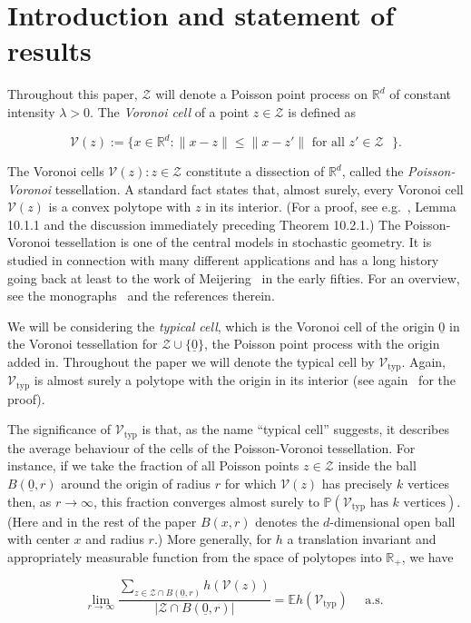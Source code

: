 \documentclass[11pt]{article}%
\newcommand{\Vcal}[0]{\ensuremath{{\mathcal V}}}
\newcommand{\Zcal}[0]{\ensuremath{{\mathcal Z}}}
\newcommand{\eR}[0]{\ensuremath{ \mathbb R}}
\newcommand{\norm}[1]{\ensuremath{\|#1\|}}
\newcommand{\Pee}[0]{\ensuremath{{\mathbb P}}}
\newcommand{\Ee}[0]{\ensuremath{{\mathbb E}}}
\newcommand{\orig}{\underline{0}}
\newcommand{\Vtyp}[0]{\Vcal_{\text{typ}}}
\begin{document}
\section{Introduction and statement of results}



Throughout this paper, $\Zcal$ will denote a Poisson point process on $\eR^d$ of constant intensity $\lambda>0$.
The {\em Voronoi cell} of a point $z \in \Zcal$ is defined as 

$$ \Vcal(z) := \{ x \in \eR^d : \norm{x-z} \leq \norm{x-z'} \text{ for all $z'\in \Zcal$ }\}. $$

The Voronoi cells $\Vcal(z) : z \in \Zcal$ constitute a dissection of $\eR^d$, called the {\em Poisson-Voronoi} 
tessellation. A standard fact states that, almost surely, every Voronoi cell $\Vcal(z)$ is a convex polytope
with $z$ in its interior. (For a proof, see e.g.~\cite{SchneiderWeil}, Lemma 10.1.1 and the discussion 
immediately preceding Theorem 10.2.1.)
The Poisson-Voronoi tessellation is one of the central models
in stochastic geometry. It is studied in connection with many different applications and has 
a long history going back at least to the work of Meijering~\cite{Meijering} in the early fifties. 
For an overview, see the monographs~\cite{SchneiderWeil,StoyanKendallMecke87} and the references therein.

We will be considering the {\em typical cell}, which is the Voronoi 
cell of the  origin $\orig$ in the Voronoi tessellation for $\Zcal \cup \{\orig\}$, the Poisson point process with the origin 
added in. Throughout the paper we will denote the typical cell by $\Vtyp$.
Again, $\Vtyp$ is almost surely a polytope with the origin in its interior (see again~\cite{SchneiderWeil} for the proof).

The significance of $\Vtyp$ is that, as the name ``typical cell'' suggests, it describes the 
average behaviour of the cells of the Poisson-Voronoi tessellation.
For instance, if we take the fraction of all Poisson points $z \in \Zcal$ inside the ball $B(\orig,r)$ around the 
origin of radius $r$
for which $\Vcal(z)$ has precisely $k$ vertices then, as $r\to\infty$, this fraction converges
almost surely to $\Pee( \Vtyp \text{ has $k$ vertices} )$.
(Here and in the rest of the paper $B(x,r)$ denotes the $d$-dimensional open ball with center $x$ and radius $r$.)
More generally, for $h$ a translation invariant and appropriately measurable function from the space of 
polytopes
into $\eR_+$, we have

\begin{equation}\label{eq:ergodic} 
\lim_{r\to\infty} \frac{\sum_{z\in\Zcal\cap B(\orig,r)} h\left( \Vcal(z)\right)}{\left|\Zcal \cap B(\orig,r)\right|}
= \Ee h( \Vtyp ) \quad \text{ a.s. } 
\end{equation}
\end{document}
